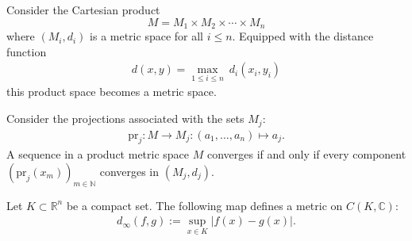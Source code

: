     \begin{example}
        Consider the Cartesian product \[M = M_1\times M_2\times\cdots\times M_n\] where $(M_i,d_i)$ is a metric space for all $i\leq n$. Equipped with the distance function
        \begin{gather}
            d(x,y) = \underset{1\leq i\leq n}{\max}\ d_i(x_i,y_i)
        \end{gather}
        this product space becomes a metric space.
    \end{example}
    \begin{property}
        Consider the projections associated with the sets $M_j$:
        \begin{gather}
            \label{metric:projection}
            \text{pr}_j:M\rightarrow M_j:(a_1,\ldots,a_n)\mapsto a_j.
        \end{gather}
        A sequence in a product metric space $M$ converges if and only if every component $(\text{pr}_j(x_m))_{m\in\mathbb{N}}$ converges in $(M_j, d_j)$.
    \end{property}

    \begin{example}
        Let $K\subset\mathbb{R}^n$ be a compact set. The following map defines a metric on $C(K,\mathbb{C})$:
        \begin{gather}
            \label{topology:supremum_distance}
            d_\infty(f,g) := \sup_{x\in K}|f(x) - g(x)|.
        \end{gather}
    \end{example}


